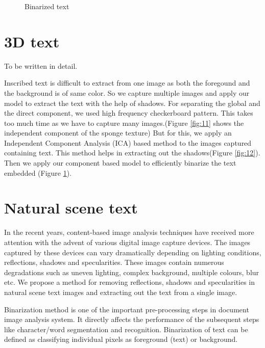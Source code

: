 \begin{figure}[t]
\centering
{}
\label{fig:subfig11}
\caption
{Binarized text}
\label{fig:13}
\end{figure}


\section{3D text}
To be written in detail.

Inscribed text is difficult to extract from one image as both the foregound and the background is of same 
color.
So we capture multiple images and apply our model to extract the text with the help of shadows.
For separating the global and the direct component, we used high frequency checkerboard pattern. 
This takes too much time as we have to capture many images.(Figure \ref{fig:11} shows
the independent component of the sponge texture)
But for this, we apply an Independent Component Analysis (ICA) based method to the images captured containing text.
This method helps in extracting out the shadows(Figure \ref{fig:12}). 
Then we apply our component based model to efficiently binarize the text
embedded (Figure \ref{fig:13}).

\section{Natural scene text}

In the recent years, content-based image analysis techniques have received more attention with the advent of various digital image capture devices.
The images captured by these devices can vary dramatically depending on lighting conditions, reflections, shadows and specularities.
These images contain numerous degradations such as uneven lighting, complex background, multiple colours, blur etc.
We propose a method for removing reflections, shadows and specularities in natural scene text images and extracting out the text from a single image. 
	
Binarization method is one of the important pre-processing steps in document image analysis system. 
It directly affects the performance of the subsequent steps like character/word segmentation and recognition.
Binarization of text can be defined as classifying individual pixels as foreground (text) or background. 


